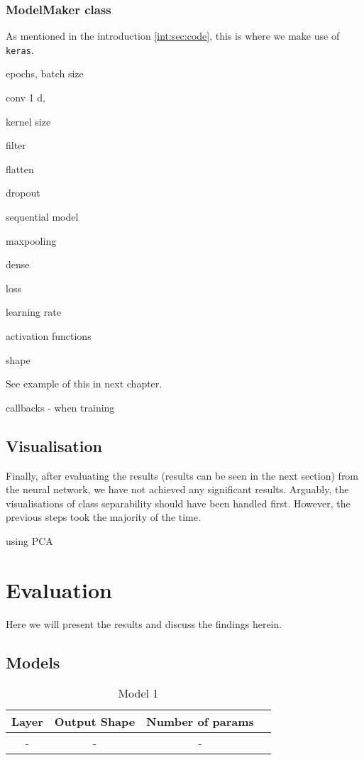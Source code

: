 \subsection{ModelMaker class}
As mentioned in the introduction \ref{int:sec:code}, this is where we make use of \verb|keras|.

epochs, batch size

conv 1 d,

kernel size

filter

flatten

dropout

sequential model

maxpooling

dense

loss

learning rate

activation functions

shape

See example of this in next chapter. 

callbacks - when training

\section{Visualisation}
Finally, after evaluating the results (results can be seen in the next section) from the neural network, we have not achieved any significant results. Arguably, the visualisations of class separability should have been handled first. However, the previous steps took the majority of the time.

using PCA

\chapter{Evaluation}
Here we will present the results and discuss the findings herein.


\section{Models}
\begin{table}[H]
	\centering
	\begin{tabular}{|c|c|c| c|} \hline
		\textbf{Layer} & \textbf{Output Shape } & \textbf{Number of params} \\ \hline \hline 
		- & - &  -  \\ \hline 
	\end{tabular}
	\caption{Model 1}
	\label{datasets}
\end{table}

